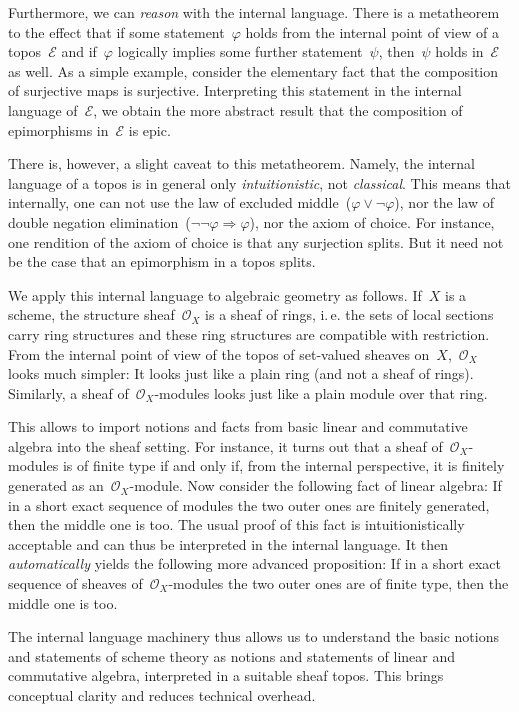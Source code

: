 \documentclass[10pt]{amsart}
\makeatletter
\theoremstyle{definition}
\theoremstyle{plain}
\theoremstyle{remark}
\newcommand{\E}{\mathcal{E}}
\renewcommand{\O}{\mathcal{O}}
\newcommand{\?}{\,{:}\,}
\renewcommand{\_}{\mathpunct{.}\,}
\newcommand{\ie}{i.\,e.\@\xspace}
\makeatother
\begin{document}
Furthermore, we can \emph{reason} with the internal language. There is a
metatheorem to the effect that if some statement~$\varphi$ holds from the
internal point of view of a topos~$\E$ and if~$\varphi$ logically implies some
further statement~$\psi$, then~$\psi$ holds in~$\E$ as well. As a simple
example, consider the elementary fact that the composition of surjective maps
is surjective. Interpreting this statement in the internal language of~$\E$, we
obtain the more abstract result that the composition of epimorphisms in~$\E$ is
epic.

There is, however, a slight caveat to this metatheorem. Namely, the internal
language of a topos is in general only \emph{intuitionistic}, not
\emph{classical}. This means that internally, one can not use the law of
excluded middle~($\varphi \vee \neg\varphi$), nor the law of double negation
elimination~($\neg\neg\varphi \Rightarrow \varphi$), nor the axiom of choice.
For instance, one rendition of the axiom of choice is that any surjection
splits. But it need not be the case that an epimorphism in a topos
splits.

We apply this internal language to algebraic geometry as follows. If~$X$ is a
scheme, the structure sheaf~$\O_X$ is a sheaf of rings, \ie the sets of
local sections carry ring structures and these ring structures are compatible
with restriction. From the internal point of view of the topos of set-valued
sheaves on~$X$,~$\O_X$ looks much simpler: It looks just like a plain ring (and
not a sheaf of rings). Similarly, a sheaf of~$\O_X$-modules looks just like a
plain module over that ring.

This allows to import notions and facts from basic linear and commutative
algebra into the sheaf setting. For instance, it turns out that a sheaf
of~$\O_X$-modules is of finite type if and only if, from the internal
perspective, it is finitely generated as an~$\O_X$-module. Now consider the
following fact of linear algebra: If in a short exact sequence of modules the two
outer ones are finitely generated, then the middle one is too. The usual proof of
this fact is intuitionistically acceptable and can thus be interpreted in the
internal language. It then \emph{automatically} yields the following more advanced
proposition: If in a short exact sequence of sheaves of~$\O_X$-modules the
two outer ones are of finite type, then the middle one is too.

The internal language machinery thus allows us to understand the basic notions
and statements of scheme theory as notions and statements of linear and
commutative algebra, interpreted in a suitable sheaf topos. This brings
conceptual clarity and reduces technical overhead.
\end{document}
